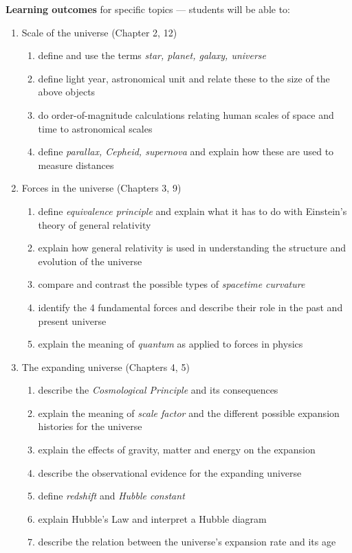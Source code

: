 \documentclass[11pt]{article}
\begin{document}
\vspace{0.5cm}
{\bf Learning outcomes} for specific topics --- students will be able to:
\begin{enumerate}

\item Scale of the universe (Chapter 2, 12)
\begin{enumerate}
\item define and use the terms {\em star, planet,  galaxy, universe}
\item define light year, astronomical unit and relate these to the size of the above objects
\item do order-of-magnitude calculations relating human scales of space and time to astronomical scales 
\item define {\em parallax, Cepheid, supernova} and explain how these are used to measure distances 
\end{enumerate}

\item  Forces in the universe (Chapters 3, 9)
\begin{enumerate}
\item define {\em equivalence principle} and explain what it has to do with Einstein's theory of general relativity
\item explain how general relativity is used in understanding the structure and evolution of the universe
\item compare and contrast the possible types of {\em spacetime curvature} 
\item identify the 4 fundamental forces and describe their role in the past and present universe
\item explain the meaning of {\em quantum} as applied to forces in physics
\end{enumerate}

\item The expanding universe (Chapters 4, 5)
\begin{enumerate}
\item describe the {\em Cosmological Principle} and its consequences
\item explain the meaning of {\em scale factor}  and the different possible expansion histories for the universe
\item explain the effects of gravity, matter  and energy on the expansion
\item describe the observational evidence for the expanding universe 
\item define {\em redshift} and {\em Hubble constant}
\item explain Hubble's Law and interpret a Hubble diagram
\item describe the relation between the universe's expansion rate and its age 
\end{enumerate}


\end{enumerate}
\end{document}
